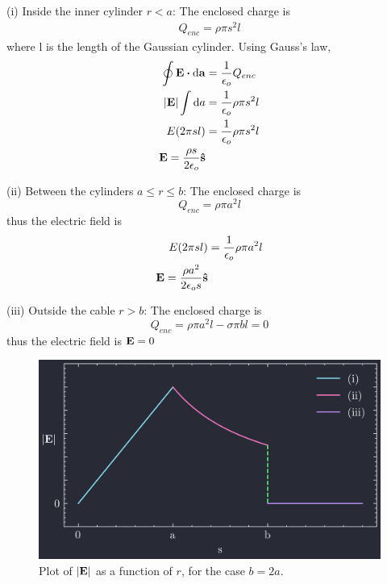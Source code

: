 \documentclass[../main.tex]{subfiles}
\begin{document}
(i) Inside the inner cylinder \(r < a\): The enclosed charge is
\begin{align*}
    Q_{enc} = \rho \pi s^2 l
\end{align*}
where l is the length of the Gaussian cylinder. Using Gauss's law,
\begin{align*}
    \oint \vb{E} \vdot \dd{\vb{a}} &= \frac{1}{\epsilon_o} Q_{enc} \\
    \abs{\vb{E}} \int \dd{a} &= \frac{1}{\epsilon_o} \rho \pi s^2l \\
    E (2\pi sl) &= \frac{1}{\epsilon_o} \rho \pi s^2l \\
    \vb{E} = \frac{\rho s}{2\epsilon_o} \vu{s}
\end{align*}

(ii) Between the cylinders \(a \leq r \leq b\): The enclosed charge is
\[ Q_{enc} = \rho \pi a^2 l \]
thus the electric field is
\begin{align*}
    E (2\pi sl) &= \frac{1}{\epsilon_o} \rho \pi a^2 l \\
    \vb{E} = \frac{\rho a^2}{2\epsilon_o s} \vu{s}
\end{align*}

(iii) Outside the cable \(r > b\): The enclosed charge is
\[ Q_{enc} = \rho \pi a^2 l - \sigma \pi b l  = 0\]
thus the electric field is
\( \vb{E} = 0 \)

\begin{figure}[ht]
    \centering
    \includegraphics[width=0.5\linewidth]{images/fig2_16.png}
    \captionsetup{width=0.8\linewidth}
    \caption{Plot of $\abs{\vb{E}}$ as a function of $r$, for the case $b = 2a$.}
    \label{fig:2_16}
\end{figure}
\end{document}
